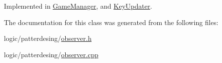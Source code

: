 Implemented in \hyperlink{class_game_manager_abcc7beda88f37957ab1c0711de030a45}{Game\-Manager}, and \hyperlink{class_key_updater_ae98e44fb4a0be038fd6482bfae40007e}{Key\-Updater}.



The documentation for this class was generated from the following files\-:\begin{DoxyCompactItemize}
\item 
logic/patterdesing/\hyperlink{observer_8h}{observer.\-h}\item 
logic/patterdesing/\hyperlink{observer_8cpp}{observer.\-cpp}\end{DoxyCompactItemize}
